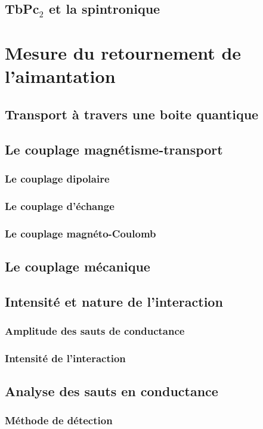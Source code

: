 \subsection{TbPc$_2$ et la spintronique}


\section{Mesure du retournement de l'aimantation}
\subsection{Transport à travers une boite quantique}
\subsection{Le couplage magnétisme-transport}
\subsubsection{Le couplage dipolaire}
\subsubsection{Le couplage d'échange}
\subsubsection{Le couplage magnéto-Coulomb}
\subsection{Le couplage mécanique}

\subsection{Intensité et nature de l'interaction}
\subsubsection{Amplitude des sauts de conductance}
\subsubsection{Intensité de l'interaction}

\subsection{Analyse des sauts en conductance}
\subsubsection{Méthode de détection}
